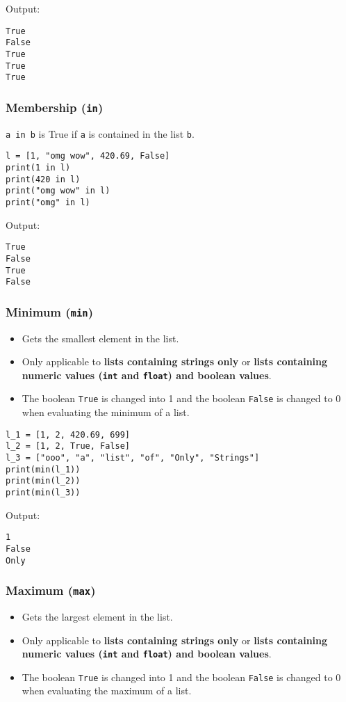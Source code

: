 \documentclass[11pt]{article}
\begin{document}
 \noindent Output:

\begin{verbatim}
True
False
True
True
True
\end{verbatim}

\subsubsection{Membership (\texttt{in})}
\label{sec:orge4560ca}
\texttt{a in b} is True if \texttt{a} is contained in the list \texttt{b}.
\begin{verbatim}
l = [1, "omg wow", 420.69, False]
print(1 in l)
print(420 in l)
print("omg wow" in l)
print("omg" in l)
\end{verbatim}

 \noindent Output:

\begin{verbatim}
True
False
True
False
\end{verbatim}

\subsubsection{Minimum (\texttt{min})}
\label{sec:orgffdba75}
\begin{itemize}
\item Gets the smallest element in the list.
\item Only applicable to \textbf{lists containing strings only} or \textbf{lists containing numeric values (\texttt{int} and \texttt{float}) and boolean values}.
\item The boolean \texttt{True} is changed into 1 and the boolean \texttt{False} is changed to 0 when evaluating the minimum of a list.
\end{itemize}

\begin{verbatim}
l_1 = [1, 2, 420.69, 699]
l_2 = [1, 2, True, False]
l_3 = ["ooo", "a", "list", "of", "Only", "Strings"]
print(min(l_1))
print(min(l_2))
print(min(l_3))
\end{verbatim}

 \noindent Output:

\begin{verbatim}
1
False
Only
\end{verbatim}

\subsubsection{Maximum (\texttt{max})}
\label{sec:orgf4ba587}
\begin{itemize}
\item Gets the largest element in the list.
\item Only applicable to \textbf{lists containing strings only} or \textbf{lists containing numeric values (\texttt{int} and \texttt{float}) and boolean values}.
\item The boolean \texttt{True} is changed into 1 and the boolean \texttt{False} is changed to 0 when evaluating the maximum of a list.
\end{itemize}
\end{document}
